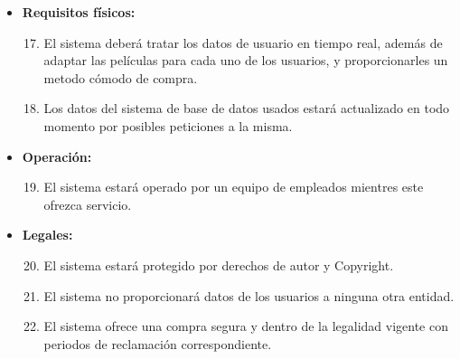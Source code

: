 \documentclass{article}
\begin{document}
\begin{itemize}
    \item \textbf{Requisitos físicos:}
        \begin{enumerate}[label=\bfseries RNF- \arabic*:]
        \setcounter{enumi}{16}
        \item El sistema deberá tratar los datos de usuario en tiempo real, además de adaptar las películas para cada uno de los usuarios, y proporcionarles un metodo cómodo de compra.
        \item Los datos del sistema de base de datos usados estará actualizado en todo momento por posibles peticiones a la misma.
        \end{enumerate}
        
    \item \textbf{Operación:}
        \begin{enumerate}[label=\bfseries RNF- \arabic*:]
        \setcounter{enumi}{18}
        \item El sistema estará operado por un equipo de empleados mientres este ofrezca servicio.
        \end{enumerate}
        
    \item \textbf{Legales:}
        \begin{enumerate}[label=\bfseries RNF- \arabic*:]
        \setcounter{enumi}{19}
        \item El sistema estará protegido por derechos de autor y Copyright.
        \item El sistema no proporcionará datos de los usuarios a ninguna otra entidad.
        \item El sistema ofrece una compra segura y dentro de la legalidad vigente con periodos de reclamación correspondiente.
        \end{enumerate}
    \end{itemize}
\end{document}
